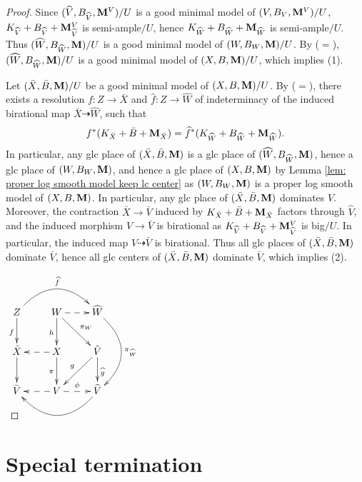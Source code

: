 \documentclass[11pt]{amsart}
\numberwithin{equation}{section}
\newcommand{\Mm}{{\bf{M}}}
\theoremstyle{definition}
\theoremstyle{definition}
\theoremstyle{definition}
\begin{document}
\begin{proof}
Since $(\widehat V,B_{\widehat V},\Mm^V)/U$ is a good minimal model of $(V,B_V,\Mm^V)/U$, $K_{\widehat V}+B_{\widehat V}+\Mm^V_{\widehat V}$ is semi-ample$/U$, hence $K_{\widehat W}+B_{\widehat W}+\Mm_{\widehat W}$ is semi-ample$/U$. Thus $(\widehat W,B_{\widehat W},\Mm)/U$ is a good minimal model of $(W,B_W,\Mm)/U$. By \cite[Lemma 3.6]{HL21} ($=$\cite[Version 3, Lemma 3.10]{HL21}), $(\widehat W,B_{\widehat W},\Mm)/U$ is a good minimal model of $(X,B,\Mm)/U$, which implies (1).

Let $(\bar X,\bar B,\Mm)/U$ be a good minimal model of $(X,B,\Mm)/U$. By \cite[Lemma 3.5(1)]{HL21} ($=$\cite[Version 3, Lemma 3.9(1)]{HL21}), there exists a resolution $f: Z\rightarrow \bar X$ and $\widehat f: Z\rightarrow\widehat W$ of indeterminacy of the induced birational map $\bar X\dashrightarrow\widehat W$, such that 
$$f^*(K_{\bar X}+\bar B+\Mm_{\bar X})=\widehat f^*(K_{\widehat W}+B_{\widehat W}+\Mm_{\widehat W}).$$ In particular, any glc place of $(\bar X,\bar B,\Mm)$ is a glc place of $(\widehat W,B_{\widehat W},\Mm)$, hence a glc place of $(W,B_W,\Mm)$, and hence a glc place of $(X,B,\Mm)$ by Lemma \ref{lem: proper log smooth model keep lc center} as $(W,B_W,\Mm)$ is a proper log smooth model of $(X,B,\Mm)$. In particular, any glc place of $(\bar X,\bar B,\Mm)$ dominates $V$. Moreover, the contraction $\bar X\rightarrow\bar V$ induced by  $K_{\bar X}+\bar B+\Mm_{\bar X}$ factors through $\widehat V$, and the induced morphism $\widehat V\rightarrow\bar V$ is birational as $K_{\widehat V}+B_{\widehat V}+\Mm^V_{\widehat V}$ is big$/U$. In particular, the induced map $V\dashrightarrow\bar V$ is birational. Thus all glc places of $(\bar X,\bar B,\Mm)$ dominate $\bar V$, hence all glc centers of  $(\bar X,\bar B,\Mm)$ dominate $\bar V$, which implies (2).
\begin{center}$\xymatrix{
Z\ar@/^2pc/[rr]^{\widehat{f}}\ar@{->}[d]_{f} & W\ar@{->}[d]_{h}\ar@{->}[dr]^{\pi_W}\ar@{-->}[r] & \widehat{W}\ar@/^2pc/[dd]^{\pi_{\widehat W}}\\
\bar X\ar@{->}[d]& X\ar@{->}[d]_{\pi}\ar@{-->}[l]& \tilde V\ar@{->}[dl]_{g}\ar@{->}[d]^{\widehat g} \\
\bar V& V\ar@{-->}[r]^{\phi}\ar@{-->}[l] & \widehat V\ar@/^2pc/[ll]
}$
\end{center}
\end{proof}


\section{Special termination}
\end{document}
